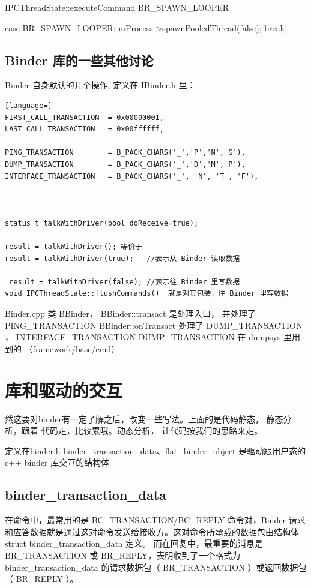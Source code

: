 \documentclass[a4paper,11pt]{article}
\begin{document}
IPCThreadState::executeCommand  BR_SPAWN_LOOPER

case BR_SPAWN_LOOPER:
        mProcess->spawnPooledThread(false);
        break;


\subsection{Binder 库的一些其他讨论}
Binder 自身默认的几个操作, 定义在 IBinder.h 里：
\begin{lstlisting}[language=]
FIRST_CALL_TRANSACTION  = 0x00000001,
LAST_CALL_TRANSACTION   = 0x00ffffff,

PING_TRANSACTION        = B_PACK_CHARS('_','P','N','G'),
DUMP_TRANSACTION        = B_PACK_CHARS('_','D','M','P'),
INTERFACE_TRANSACTION   = B_PACK_CHARS('_', 'N', 'T', 'F'),



status_t talkWithDriver(bool doReceive=true);

result = talkWithDriver(); 等价于
result = talkWithDriver(true);   //表示从 Binder 读取数据

 result = talkWithDriver(false); //表示往 Binder 里写数据
void IPCThreadState::flushCommands()  就是对其包装，往 Binder 里写数据
\end{lstlisting}
Binder.cpp  类 BBinder，
BBinder::transact 是处理入口， 并处理了  PING_TRANSACTION
BBinder::onTransact 处理了 DUMP_TRANSACTION ， INTERFACE_TRANSACTION
DUMP_TRANSACTION 在 dumpsys 里用到的 （framework/base/cmd）

\section{库和驱动的交互}
然这要对binder有一定了解之后，改变一些写法。上面的是代码静态， 静态分析，跟着
代码走，比较累哦。动态分析， 让代码按我们的思路来走。

定义在binder.h binder_transaction_data、flat_binder_object 是驱动跟用户态的
c++ binder 库交互的结构体

\subsection{binder_transaction_data}\label{BinderTransaction}
在命令中，最常用的是 BC_TRANSACTION/BC_REPLY 命令对，Binder
请求和应答数据就是通过这对命令发送给接收方。这对命令所承载的数据包由结构体
struct binder_transaction_data 定义。
而在回复中，最重要的消息是 BR_TRANSACTION 或 BR_REPLY，表明收到了一个格式为
binder_transaction_data 的请求数据包（ BR_TRANSACTION ）或返回数据包（ BR_REPLY
）。
\end{document}
